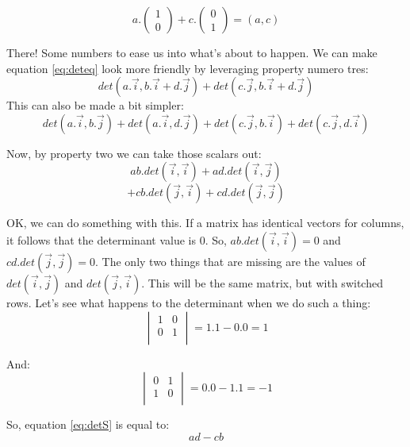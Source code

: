 \documentclass[a4,12pt,twosided,openany]{memoir}
\begin{document}
\[a.\begin{pmatrix}
1\\
0
\end{pmatrix} + c.\begin{pmatrix}
0\\
1
\end{pmatrix} = (a,c)\]
\par 
\indent
There! Some numbers to ease us into what’s about to happen. We can make equation \ref{eq:deteq} look more friendly by leveraging property numero tres:
\[det(a.\overrightarrow{i}, b.\overrightarrow{i} + d.\overrightarrow{j}) + det(c.\overrightarrow{j}, b.\overrightarrow{i} + d.\overrightarrow{j}) \]
This can also be made a bit simpler:
\[det(a.\overrightarrow{i}, b.\overrightarrow{j} ) +
  det(a.\overrightarrow{i}, d.\overrightarrow{j} ) +
  det(c.\overrightarrow{j}, b.\overrightarrow{i} ) +
  det(c.\overrightarrow{j}, d.\overrightarrow{i} ) 
\]
\par 
\indent
Now, by property two we can take those scalars out:
\begin{equation}\label{eq:detS}
ab.det(\overrightarrow{i}, \overrightarrow{i}) + ad.det(\overrightarrow{i},\overrightarrow{j}) 
\end{equation}
\[+ cb.det(\overrightarrow{j},\overrightarrow{i}) + cd.det(\overrightarrow{j},\overrightarrow{j})\]
\par 
\indent
OK, we can do something with this. If a matrix has identical vectors for columns, it follows that the determinant value is 0. So,  $ab.det(\overrightarrow{i}, \overrightarrow{i}) = 0$ and $cd.det(\overrightarrow{j},\overrightarrow{j}) = 0$. The only two things that are missing are the values of $det(\overrightarrow{i},\overrightarrow{j})$ and $det(\overrightarrow{j},\overrightarrow{i})$. This will be the same matrix, but with switched rows. Let’s see what happens to the determinant when we do such a thing:
\[ \begin{vmatrix}
1 & 0\\
0 & 1\\
\end{vmatrix} = 1.1 -0.0 = 1
\]
\par 
\indent
And:
\[ \begin{vmatrix}
0 & 1\\
1 & 0\\
\end{vmatrix} = 0.0 - 1.1 = -1
\]
\par 
\indent
So, equation \ref{eq:detS} is equal to:
\[ad - cb\]
\par 
\indent
\end{document}
